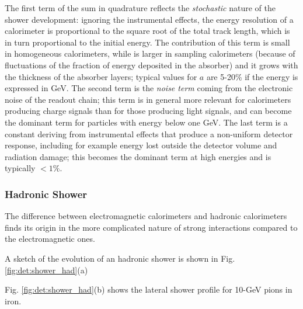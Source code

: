 The first term of the sum in quadrature reflects the \textit{stochastic} nature of the shower development: ignoring the instrumental effects, the energy resolution of a calorimeter is proportional to the square root of the total track length, which is in turn proportional to the initial energy. The contribution of this term is small in homogeneous calorimeters, while is larger in sampling calorimeters (because of fluctuations of the fraction of energy deposited in the absorber) and it grows with the thickness of the absorber layers; typical values for $a$ are 5-20\% if the energy is expressed in GeV. The second term is the \textit{noise term} coming from the electronic noise of the readout chain; this term is in general more relevant for calorimeters producing charge signals than for those producing light signals, and can become the dominant term for particles with energy below one GeV. The last term is a constant deriving from instrumental effects that produce a non-uniform detector response, including for example energy lost outside the detector volume and radiation damage; this becomes the dominant term at high energies and is typically $<1\%$. 



\subsubsection{Hadronic Shower}

The difference between electromagnetic calorimeters and hadronic calorimeters finds its origin in the more complicated nature of strong interactions compared to the electromagnetic ones.

A sketch of the evolution of an hadronic shower is shown in Fig. \ref{fig:det:shower_had}(a)

Fig. \ref{fig:det:shower_had}(b) shows the lateral shower profile for 10-GeV pions in iron.

